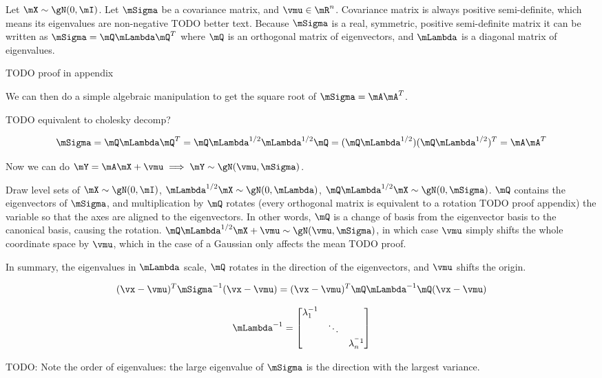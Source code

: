 \begin{tcolorbox}
  Let $\mX \sim \gN(0, \mI)$. Let $\mSigma$ be a covariance matrix, and $\vmu
  \in \mR^n$. Covariance matrix is always positive semi-definite, which means
  its eigenvalues are non-negative {TODO better text}. Because $\mSigma$ is a
  real, symmetric, positive semi-definite matrix it can be written as
  $\mSigma = \mQ \mLambda \mQ^T$ where $\mQ$ is an orthogonal matrix of
  eigenvectors, and $\mLambda$ is a diagonal matrix of eigenvalues.

  TODO proof in appendix

  We can then do a simple algebraic manipulation to get the square root of $\mSigma = \mA \mA^T$.

  TODO equivalent to cholesky decomp?

  \begin{equation}
    \mSigma = \mQ \mLambda \mQ^T = \mQ \mLambda^{1/2} \mLambda^{1/2} \mQ = (\mQ
    \mLambda^{1/2}) (\mQ \mLambda^{1/2})^T = \mA \mA^T
  \end{equation}

  Now we can do $\mY = \mA \mX + \vmu \implies \mY \sim \gN(\vmu, \mSigma)$.

  Draw level sets of $\mX \sim \gN(0, \mI)$, $\mLambda^{1/2} \mX \sim \gN(0,
  \mLambda)$, $\mQ \mLambda^{1/2} \mX \sim \gN(0, \mSigma)$. $\mQ$ contains the
  eigenvectors of $\mSigma$, and multiplication by $\mQ$ rotates (every
  orthogonal matrix is equivalent to a rotation  {TODO proof appendix}) the
  variable so that the axes are aligned to the eigenvectors. In other words,
  $\mQ$ is a change of basis from the eigenvector basis to the canonical basis,
  causing the rotation. $\mQ \mLambda^{1/2} \mX + \vmu \sim \gN(\vmu,
  \mSigma)$, in which case $\vmu$ simply shifts the whole coordinate space by
  $\vmu$, which in the case of a Gaussian only affects the mean {TODO proof}.

  In summary, the eigenvalues in $\mLambda$ scale, $\mQ$ rotates in the
  direction of the eigenvectors, and $\vmu$ shifts the origin.

  \begin{equation}
    (\vx - \vmu)^T \mSigma^{-1} (\vx - \vmu) = (\vx - \vmu)^T \mQ \mLambda^{-1} \mQ (\vx - \vmu)
  \end{equation}

  \begin{equation}
    \mLambda^{-1} = \begin{bmatrix}
      \lambda_1^{-1} & & \\
                     & \ddots & \\
                     & & \lambda_n^{^-1}
    \end{bmatrix}
  \end{equation}

  TODO: Note the order of eigenvalues: the large eigenvalue of $\mSigma$ is the
  direction with the largest variance.
\end{tcolorbox}


